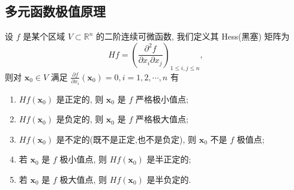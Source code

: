 \documentclass[../../main.tex]{subfiles}%
\begin{document}
\subsection{多元函数极值原理}

\begin{theorem}[多元函数极值原理]\label{theorem:多元函数极值原理}
设 \( f \) 是某个区域 \( V \subset \mathbb{R}^n \) 的二阶连续可微函数, 我们定义其 Hess(黑塞) 矩阵为
\[
Hf = \left( \frac{\partial^2 f}{\partial x_i \partial x_j} \right)_{1 \leqslant i, j \leqslant n},
\]
则对 \( \mathbf{x}_0 \in V \) 满足 \( \frac{\partial f}{\partial x_i}(\mathbf{x}_0) = 0, i = 1, 2, \cdots, n \) 有
\begin{enumerate}[(1)]
\item \( Hf(\mathbf{x}_0) \) 是正定的, 则 \( \mathbf{x}_0 \) 是 \( f \) 严格极小值点;

\item \( Hf(\mathbf{x}_0) \) 是负定的, 则 \( \mathbf{x}_0 \) 是 \( f \) 严格极大值点;

\item \( Hf(\mathbf{x}_0) \) 是不定的(既不是正定,也不是负定), 则 \( \mathbf{x}_0 \) 不是 \( f \) 极值点;

\item 若 \( \mathbf{x}_0 \) 是 \( f \) 极小值点, 则 \( Hf(\mathbf{x}_0) \) 是半正定的;

\item 若 \( \mathbf{x}_0 \) 是 \( f \) 极大值点, 则 \( Hf(\mathbf{x}_0) \) 是半负定的.
\end{enumerate}
\end{theorem}
\end{document}
